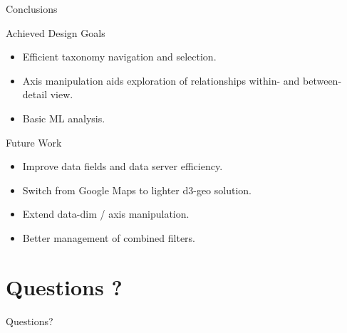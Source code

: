 \documentclass{beamer}
\begin{document}
\begin{frame}{Conclusions}

  \begin{block}{Achieved Design Goals}

    \begin{itemize}

      \item Efficient taxonomy navigation and selection.

      \item Axis manipulation aids exploration of relationships within- and
        between- detail view.

      \item Basic ML analysis.

    \end{itemize}

  \end{block}

  \begin{block}{Future Work}

    \begin{itemize}

      \item Improve data fields and data server efficiency.

      \item Switch from Google Maps to lighter d3-geo solution.

      \item Extend data-dim / axis manipulation.

      \item Better management of combined filters.

    \end{itemize}

  \end{block}

\end{frame}

\section*{Questions ?}

\begin{frame}[shrink=10]{Questions?}

  \printbibliography

\end{frame}
\end{document}
